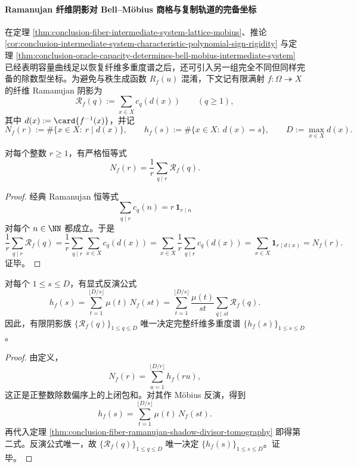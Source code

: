 \paragraph{Ramanujan 纤维阴影对 Bell--Möbius 商格与复制轨道的完备坐标}
在定理 \ref{thm:conclusion-fiber-intermediate-system-lattice-mobius}、推论 \ref{cor:conclusion-intermediate-system-characteristic-polynomial-sign-rigidity} 与定理 \ref{thm:conclusion-oracle-capacity-determines-bell-mobius-intermediate-system} 已经表明容量曲线足以恢复纤维多重度谱之后，还可引入另一组完全不同但同样完备的除数型坐标。为避免与秩生成函数 \(R_f(u)\) 混淆，下文记有限满射 \(f:\Omega\twoheadrightarrow X\) 的纤维 Ramanujan 阴影为
\[
\mathscr R_f(q):=\sum_{x\in X}c_q(d(x))
\qquad(q\ge 1),
\]
其中 \(d(x):=\card{f^{-1}(x)}\)，并记
\[
N_f(r):=\#\{x\in X:\ r\mid d(x)\},
\qquad
h_f(s):=\#\{x\in X:\ d(x)=s\},
\qquad
D:=\max_{x\in X}d(x).
\]

\begin{theorem}\label{thm:conclusion-fiber-ramanujan-shadow-divisor-tomography}
对每个整数 \(r\ge 1\)，有严格恒等式
\[
N_f(r)=\frac1r\sum_{q\mid r}\mathscr R_f(q).
\]
\end{theorem}
\begin{proof}
经典 Ramanujan 恒等式
\[
\sum_{q\mid r}c_q(n)=r\,\mathbf 1_{r\mid n}
\]
对每个 \(n\in \NN\) 都成立。于是
\[
\frac1r\sum_{q\mid r}\mathscr R_f(q)
=
\frac1r\sum_{q\mid r}\sum_{x\in X}c_q(d(x))
=
\sum_{x\in X}\frac1r\sum_{q\mid r}c_q(d(x))
=
\sum_{x\in X}\mathbf 1_{r\mid d(x)}
=
N_f(r).
\]
证毕。
\end{proof}

\begin{theorem}\label{thm:conclusion-fiber-ramanujan-shadow-histogram-inversion}
对每个 \(1\le s\le D\)，有显式反演公式
\[
h_f(s)=\sum_{t=1}^{\lfloor D/s\rfloor}\mu(t)\,N_f(st)
=
\sum_{t=1}^{\lfloor D/s\rfloor}\frac{\mu(t)}{st}\sum_{q\mid st}\mathscr R_f(q).
\]
因此，有限阴影族 \(\{\mathscr R_f(q)\}_{1\le q\le D}\) 唯一决定完整纤维多重度谱 \(\{h_f(s)\}_{1\le s\le D}\)。
\end{theorem}
\begin{proof}
由定义，
\[
N_f(r)=\sum_{u=1}^{\lfloor D/r\rfloor}h_f(ru),
\]
这正是正整数除数偏序上的上闭包和。对其作 Möbius 反演，得到
\[
h_f(s)=\sum_{t=1}^{\lfloor D/s\rfloor}\mu(t)\,N_f(st).
\]
再代入定理 \ref{thm:conclusion-fiber-ramanujan-shadow-divisor-tomography} 即得第二式。反演公式唯一，故 \(\{\mathscr R_f(q)\}_{1\le q\le D}\) 唯一决定 \(\{h_f(s)\}_{1\le s\le D}\)。证毕。
\end{proof}

